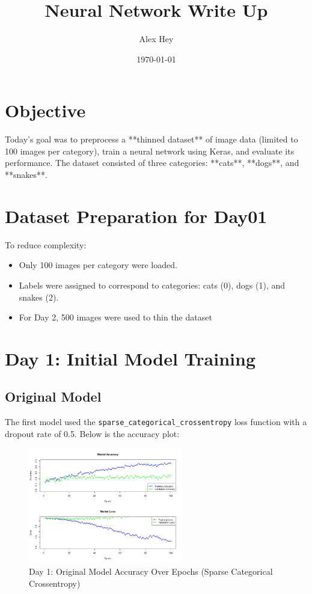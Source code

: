 \documentclass{article}
\title{Neural Network Write Up}
\author{Alex Hey}
\date{\today}
\begin{document}
\maketitle

\section*{Objective}
Today's goal was to preprocess a **thinned dataset** of image data (limited to 100 images per category), train a neural network using Keras, and evaluate its performance. The dataset consisted of three categories: **cats**, **dogs**, and **snakes**.

\section*{Dataset Preparation for Day01}
To reduce complexity:
\begin{itemize}
    \item Only 100 images per category were loaded.
    \item Labels were assigned to correspond to categories: cats (0), dogs (1), and snakes (2).
    \item For Day 2, 500 images were used to thin the dataset
\end{itemize}

\section*{Day 1: Initial Model Training}

\subsection*{Original Model}
The first model used the \texttt{sparse\_categorical\_crossentropy} loss function with a dropout rate of 0.5. Below is the accuracy plot:

\begin{figure}[h!]
    \centering
    \includegraphics[width=0.6\textwidth]{../results/training_plots.png}
    \caption{Day 1: Original Model Accuracy Over Epochs (Sparse Categorical Crossentropy)}
\end{figure}
\end{document}

